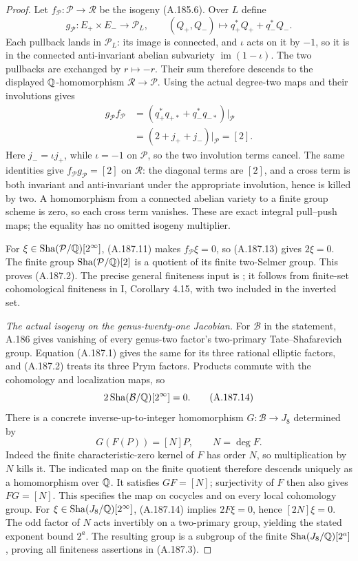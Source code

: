 \begin{proof}
Let \(f_{\mathcal P}:\mathcal P\to\mathcal R\) be
the isogeny (A.185.6).  Over \(L\) define
\[
 g_{\mathcal P}:E_+\times E_-\longrightarrow\mathcal P_L,
                  \qquad(Q_+,Q_-)\longmapsto
                           q_+^*Q_+ +q_-^*Q_-.
\tag{A.187.12}
\]
Each pullback lands in \(\mathcal P_L\): its image is
connected, and \(\iota\) acts on it by \(-1\), so
it is in the connected anti-invariant abelian subvariety
\(\operatorname{im}(1-\iota)\).  The two pullbacks
are exchanged by \(r\mapsto-r\).  Their sum therefore
descends to the displayed \(\mathbb Q\)-homomorphism
\(\mathcal R\to\mathcal P\).  Using the actual
degree-two maps and their involutions gives
\[
\begin{aligned}
 g_{\mathcal P}f_{\mathcal P}
  &=(q_+^*q_{+*}+q_-^*q_{-*})|_{\mathcal P}\\
  &=(2+j_++j_-)|_{\mathcal P}=[2].
\end{aligned}
\tag{A.187.13}
\]
Here \(j_- =\iota j_+\), while \(\iota=-1\)
on \(\mathcal P\), so the two involution terms cancel.
The same identities give
\(f_{\mathcal P}g_{\mathcal P}=[2]\) on
\(\mathcal R\): the diagonal terms are \([2]\),
and a cross term is both invariant and anti-invariant
under the appropriate involution, hence is killed by
two.  A homomorphism from a connected abelian variety
to a finite group scheme is zero, so each cross term
vanishes.  These are exact integral pull--push maps;
the equality has no omitted isogeny multiplier.

For \(\xi\in\operatorname{Sha}(\mathcal P/\mathbb Q)[2^\infty]\),
(A.187.11) makes \(f_{\mathcal P}\xi=0\), so
(A.187.13) gives \(2\xi=0\).  The finite group
\(\operatorname{Sha}(\mathcal P/\mathbb Q)[2]\) is a quotient of its
finite two-Selmer group.  This proves (A.187.2).
The precise general finiteness input is
\cite[I, Proposition 6.4 and Remark 6.7, pp.75--77]{BIR_MilneADT};
it follows from finite-set cohomological finiteness in
I, Corollary 4.15, with two included in the inverted set.

\emph{The actual isogeny on the genus-twenty-one Jacobian.}
For \(\mathcal B\) in the statement, A.186 gives
vanishing of every genus-two factor's two-primary
Tate--Shafarevich group.  Equation (A.187.1) gives
the same for its three rational elliptic factors,
and (A.187.2) treats its three Prym factors.  Products
commute with the cohomology and localization maps, so
\[
                       2\operatorname{Sha}(\mathcal B/\mathbb Q)[2^\infty]=0.
\tag{A.187.14}
\]
There is a concrete inverse-up-to-integer homomorphism
\(G:\mathcal B\to J_8\) determined by
\[
                   G(F(P))=[N]P,\qquad N=\deg F.
\tag{A.187.15}
\]
Indeed the finite characteristic-zero kernel of \(F\)
has order \(N\), so multiplication by \(N\) kills
it.  The indicated map on the finite quotient therefore
descends uniquely as a homomorphism over \(\mathbb Q\).
It satisfies \(GF=[N]\); surjectivity of \(F\)
then also gives \(FG=[N]\).  This specifies the
map on cocycles and on every local cohomology group.
For \(\xi\in\operatorname{Sha}(J_8/\mathbb Q)[2^\infty]\),
(A.187.14) implies \(2F\xi=0\), hence
\([2N]\xi=0\).  The odd factor of \(N\) acts
invertibly on a two-primary group, yielding the stated
exponent bound \(2^a\).  The resulting group is a
subgroup of the finite \(\operatorname{Sha}(J_8/\mathbb Q)[2^a]\),
proving all finiteness assertions in (A.187.3).


\end{proof}
